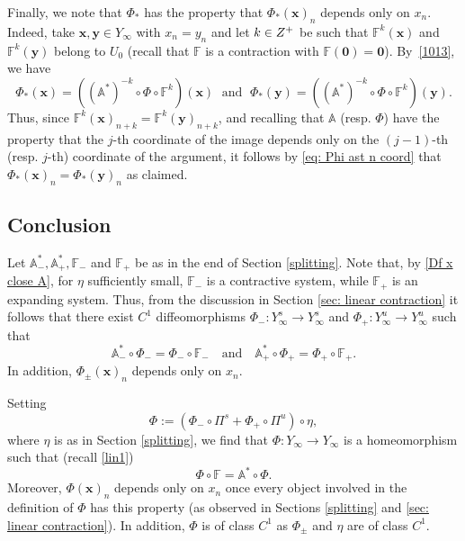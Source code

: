 \documentclass[reqno, a4paper, 10pt]{amsart}
\theoremstyle{plain}
\numberwithin{equation}{section}
\theoremstyle{remark}
\def\Z{\mathbb{Z}}
\begin{document}
Finally, we note that $\Phi_*$ has the property that $\Phi_* (\mathbf x)_n$ depends only on $x_n$. Indeed, take $\mathbf x, \mathbf y\in Y_\infty$ with $x_n=y_n$ and let $k\in \mathbb \Z^+$ be such that $\mathbb F^k(\mathbf x)$ and $\mathbb F^k(\mathbf y)$  belong to $U_0$ (recall that $\mathbb F$ is a contraction with $\mathbb F(\mathbf 0)=\mathbf 0$). By~\eqref{1013}, we have 
\begin{equation}\label{eq: Phi ast n coord}
\Phi_*(\mathbf x)=((\mathbb A^\ast)^{-k}\circ \Phi \circ \mathbb F^k)(\mathbf x) \;\text{ and }\; 
\Phi_*(\mathbf y)=((\mathbb A^\ast)^{-k}\circ \Phi \circ \mathbb F^k)(\mathbf y).
\end{equation}
Thus, since $\mathbb F^k (\mathbf x)_{n+k}=\mathbb F^k(\mathbf y)_{n+k}$, and recalling that $\mathbb A$ (resp. $\Phi$) have the property that the $j$-th coordinate of the image depends only on the $(j-1)$-th (resp. $j$-th) coordinate of the argument, it follows by \eqref{eq: Phi ast n coord} that $\Phi_* (\mathbf x)_{n}=\Phi_* (\mathbf y)_{n}$ as claimed.

\subsection{Conclusion} Let $\mathbb A^\ast_-, \mathbb A^\ast_+, \mathbb F_-$ and $\mathbb F_+$ be as in the end of Section \ref{splitting}. Note that, by \eqref{Df x close A}, for $\eta$ sufficiently small, $\mathbb F_-$ is a contractive system, while $\mathbb F_+$ is an expanding system. Thus, from the discussion in Section \ref{sec: linear contraction} it follows that there exist $C^1$ diffeomorphisms $\Phi_{-}\colon Y_\infty^s \to Y_\infty^s$ and $\Phi_+\colon Y_\infty^u \to Y_\infty^u$ such that 
\[
\mathbb A^\ast_-\circ \Phi_-=\Phi_-\circ \mathbb F_{-} \quad \text{and} \quad \mathbb A^\ast_+\circ \Phi_+=\Phi_+\circ \mathbb F_{+}.
\]
In addition, $\Phi_{\pm}(\mathbf x)_n$ depends only on $x_n$.

Setting 
\begin{equation}\label{eq: def Phi final}
\Phi :=(\Phi_-\circ \Pi^s+\Phi_+\circ \Pi^u)\circ \eta,
\end{equation}
where $\eta$ is as in Section \ref{splitting}, we find that $\Phi \colon Y_\infty\to Y_\infty$ is a homeomorphism such that (recall \eqref{lin1})
\[
\Phi \circ \mathbb F=\mathbb A^\ast \circ \Phi.
\]
Moreover, $\Phi(\mathbf x)_n$ depends only on $x_n$ once every object involved in the definition of $\Phi$ has this property (as observed in Sections \ref{splitting} and \ref{sec: linear contraction}).  In addition, $\Phi$ is of class $C^1$ as $\Phi_{\pm}$ and $\eta$ are of class $C^1$.
\end{document}
